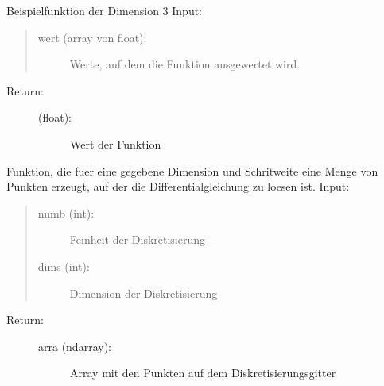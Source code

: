 \documentclass[letterpaper,10pt,ngerman, oneside, openright]{sphinxmanual}
\begin{document}

\begin{fulllineitems}
\label{\detokenize{index:aufg_5_2.fntn3}}
Beispielfunktion der Dimension 3
Input:
\begin{quote}
\begin{description}
\item[{wert (array von float):}] \leavevmode
Werte, auf dem die Funktion ausgewertet wird.

\end{description}
\end{quote}
\begin{description}
\item[{Return:}] \leavevmode\begin{description}
\item[{(float):}] \leavevmode
Wert der Funktion

\end{description}

\end{description}

\end{fulllineitems}


\begin{fulllineitems}
\label{\detokenize{index:aufg_5_2.gitter}}
Funktion, die fuer eine gegebene Dimension und Schritweite eine Menge von Punkten erzeugt, auf
der die Differentialgleichung zu loesen ist.
Input:
\begin{quote}
\begin{description}
\item[{numb (int):}] \leavevmode
Feinheit der Diskretisierung

\item[{dims (int):}] \leavevmode
Dimension der Diskretisierung

\end{description}
\end{quote}
\begin{description}
\item[{Return:}] \leavevmode\begin{description}
\item[{arra (ndarray):}] \leavevmode
Array mit den Punkten auf dem Diskretisierungsgitter

\end{description}

\end{description}

\end{fulllineitems}
\end{document}
